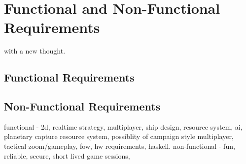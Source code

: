 \chapter[Requirements]{Functional and Non-Functional Requirements}
\label{ch:requirements}


 with a new thought.


\section{Functional Requirements}




\section{Non-Functional Requirements}


functional - 2d, realtime strategy, multiplayer, ship design, resource system, ai, planetary capture resource system, possiblity of campaign style multiplayer, tactical zoom/gameplay, fow, hw requirements, haskell.
non-functional - fun, reliable, secure, short lived game sessions, 
